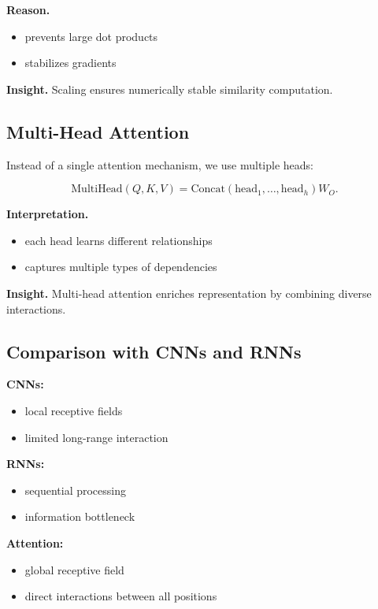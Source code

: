 \noindent
\textbf{Reason.}

\begin{itemize}
    \item prevents large dot products
    \item stabilizes gradients
\end{itemize}

\medskip

\noindent
\textbf{Insight.}  
Scaling ensures numerically stable similarity computation.

\subsection{Multi-Head Attention}

Instead of a single attention mechanism, we use multiple heads:

\[
\text{MultiHead}(Q,K,V) =
\text{Concat}(\text{head}_1, \dots, \text{head}_h) W_O.
\]

\medskip

\noindent
\textbf{Interpretation.}

\begin{itemize}
    \item each head learns different relationships
    \item captures multiple types of dependencies
\end{itemize}

\medskip

\noindent
\textbf{Insight.}  
Multi-head attention enriches representation by combining diverse interactions.

\subsection{Comparison with CNNs and RNNs}

\textbf{CNNs:}
\begin{itemize}
    \item local receptive fields
    \item limited long-range interaction
\end{itemize}

\textbf{RNNs:}
\begin{itemize}
    \item sequential processing
    \item information bottleneck
\end{itemize}

\textbf{Attention:}
\begin{itemize}
    \item global receptive field
    \item direct interactions between all positions
\end{itemize}

